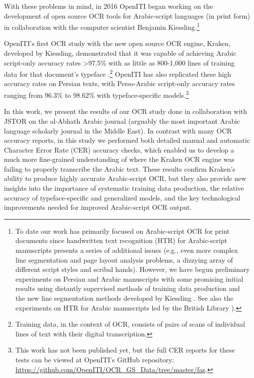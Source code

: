 With these problems in mind, in 2016 OpenITI began working on the development
of open source OCR tools for Arabic-script languages (in print form) in
collaboration with the computer scientist Benjamin Kiessling.\footnote{To date
our work has primarily focused on Arabic-script OCR for print documents since
handwritten text recognition (HTR) for Arabic-script manuscripts presents a
series of additional issues (e.g., even more complex line segmentation and page
layout analysis problems, a dizzying array of different script styles and
scribal hands). However, we have begun preliminary experiments on Persian and
Arabic manuscripts with some promising initial results using distantly
supervised methods of training data production and the new line segmentation
methods developed by Kiessling \cite{kiessling2019badam}. See also the
experiments on HTR for Arabic manuscripts led by the British Library
\cite{clausner2018icfhr,rasm2019res,rasm2020trans}).}

 OpenITI’s first OCR study with the new open source OCR engine, Kraken,
developed by Kiessling, demonstrated that it was capable of achieving Arabic
script-only accuracy rates >97.5\% with as little as 800-1,000 lines of
training data for that document’s typeface
\cite{kiessling2017important}.\footnote{Training data, in the context of OCR,
consists of pairs of scans of individual lines of text with their digital
transcription.} OpenITI has also replicated these high accuracy rates on
Persian texts, with Perso-Arabic script-only accuracy rates ranging from 96.3\%
to 98.62\% with typeface-specific models.\footnote{This work has not been
published yet, but the full CER reports for these tests can be viewed at
OpenITI’s GitHub repository:
\url{https://github.com/OpenITI/OCR_GS_Data/tree/master/fas}.}

In this work, we present the results of our OCR study done in collaboration
with JSTOR on the al-Abhath Arabic journal (arguably the most important Arabic
language scholarly journal in the Middle East). In contrast with many OCR
accuracy reports, in this study we performed both detailed manual and automatic
Character Error Rate (CER) accuracy checks, which enabled us to develop a much
more fine-grained understanding of where the Kraken OCR engine was failing to
properly transcribe the Arabic text. These results confirm Kraken’s ability to
produce highly accurate Arabic-script OCR, but they also provide new insights
into the importance of systematic training data production, the relative
accuracy of typeface-specific and generalized models, and the key technological
improvements needed for improved Arabic-script OCR output. 

